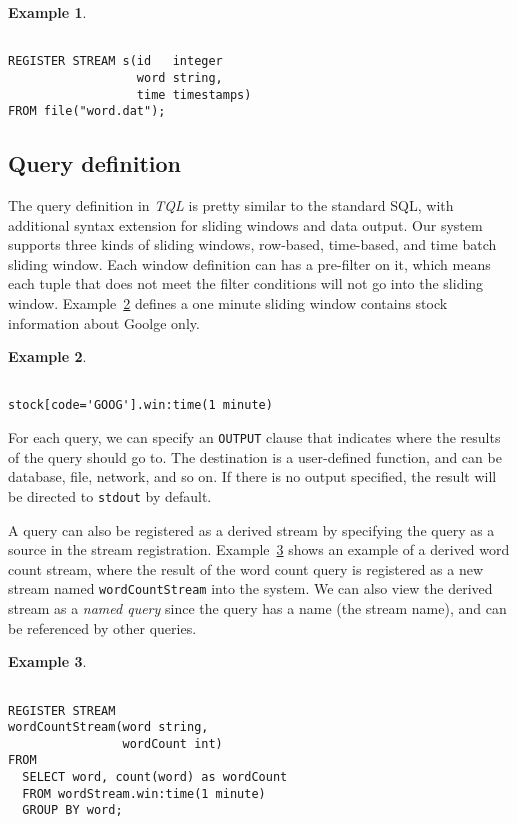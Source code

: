 \documentclass[conference, twocolumn, twoside, 11pt]{IEEEtran}
\theoremstyle{definition}
\newtheorem{example}{Example}[section]
\begin{document}
\begin{example}\label{reg-exmp}
\begin{verbatim}

REGISTER STREAM s(id   integer
                  word string, 
                  time timestamps)
FROM file("word.dat");
\end{verbatim}
\end{example}
\subsection{Query definition}\label{query-def}
The query definition in \emph{TQL} is pretty similar to the standard SQL, with additional syntax extension for sliding windows and data output. Our system supports three kinds of sliding windows, row-based, time-based, and time batch sliding window. Each window definition can has a pre-filter on it, which means each tuple that does not meet the filter conditions will not go into the sliding window. Example~\ref{win-exmp} defines a one minute sliding window contains stock information about Goolge only.

\begin{example}\label{win-exmp}
\begin{verbatim}

stock[code='GOOG'].win:time(1 minute)
\end{verbatim}
\end{example}

For each query, we can specify an \texttt{OUTPUT} clause that indicates where the results of the query should go to. The destination is a user-defined function, and can be database, file, network, and so on. If there is no output specified, the result will be directed to \texttt{stdout} by default.

A query can also be registered as a derived stream by specifying the query as a source in the stream registration. Example~\ref{named-exmp} shows an example of a derived word count stream, where the result of the word count query is registered as a new stream named \texttt{wordCountStream} into the system. We can also view the derived stream as a \emph{named query} since the query has a name (the stream name), and can be referenced by other queries.  

\begin{example}\label{named-exmp}
\begin{verbatim}

REGISTER STREAM
wordCountStream(word string, 
                wordCount int)
FROM
  SELECT word, count(word) as wordCount
  FROM wordStream.win:time(1 minute)
  GROUP BY word;
\end{verbatim}
\end{example}
\end{document}
